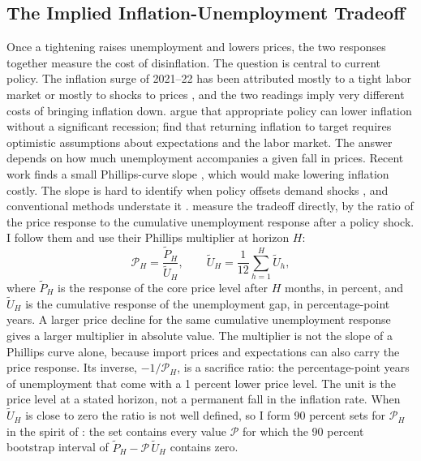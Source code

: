 \documentclass[11pt]{article}
\begin{document}


\subsection{The Implied Inflation-Unemployment Tradeoff}\label{sec:tradeoff}
Once a tightening raises unemployment and lowers prices, the two responses together measure the cost of disinflation. The question is central to current policy. The inflation surge of 2021--22 has been attributed mostly to a tight labor market \citep{benigno2023,ball2022} or mostly to shocks to prices \citep{blanchard2023}, and the two readings imply very different costs of bringing inflation down. \citet{benigno2023} argue that appropriate policy can lower inflation without a significant recession; \citet{ball2022} find that returning inflation to target requires optimistic assumptions about expectations and the labor market. The answer depends on how much unemployment accompanies a given fall in prices. Recent work finds a small Phillips-curve slope \citep{hazell2022,delnegro2020,ball2019,fitzgerald2024}, which would make lowering inflation costly. The slope is hard to identify when policy offsets demand shocks \citep{mcleay2020}, and conventional methods understate it \citep{barnichon2020}. \citet{barnichon2021} measure the tradeoff directly, by the ratio of the price response to the cumulative unemployment response after a policy shock. I follow them and use their Phillips multiplier at horizon $H$:
\begin{equation}
\mathcal{P}_H = \frac{\tilde P_H}{\tilde U_H}, \qquad \tilde U_H=\frac{1}{12}\sum_{h=1}^{H}\tilde U_h, \label{eq:pm}
\end{equation}
where $\tilde P_H$ is the response of the core price level after $H$ months, in percent, and $\tilde U_H$ is the cumulative response of the unemployment gap, in percentage-point years. A larger price decline for the same cumulative unemployment response gives a larger multiplier in absolute value. The multiplier is not the slope of a Phillips curve alone, because import prices and expectations can also carry the price response. Its inverse, $-1/\mathcal{P}_H$, is a sacrifice ratio: the percentage-point years of unemployment that come with a 1 percent lower price level. The unit is the price level at a stated horizon, not a permanent fall in the inflation rate. When $\tilde U_H$ is close to zero the ratio is not well defined, so I form 90 percent sets for $\mathcal{P}_H$ in the spirit of \citet{anderson1949}: the set contains every value $\mathcal{P}$ for which the 90 percent bootstrap interval of $\tilde P_H-\mathcal{P}\,\tilde U_H$ contains zero.
\end{document}
